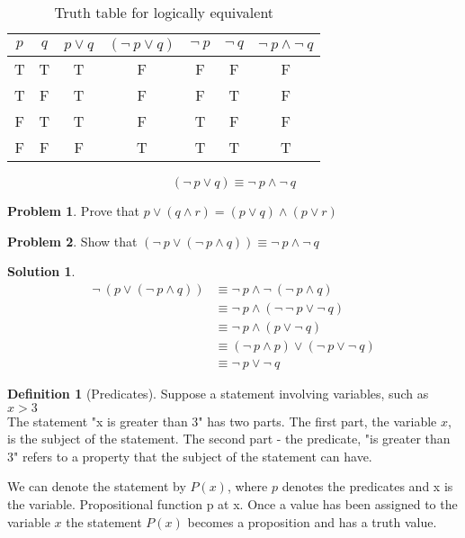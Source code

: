 \documentclass[12pt,oneside,a4paper]{book}
\theoremstyle{remark}
\theoremstyle{definition}
\newtheorem{prob}{Problem}[section]
\newtheorem{defn}{Definition}
\newtheorem*{soln}{Solution}
\begin{document}
\begin{table}[H]
    \centering
    \begin{tabular}{|c|c|c|c|c|c|c|}
        \hline
        $ p $ & $ q $ & \(p\vee q\) & \((\neg\ p\vee q)\) & \(\neg\ p\) & \(\neg\ q\) & \(\neg\ p\wedge \neg\ q\) \\ \hline
        T     & T     & T           & F                   & F           & F           & F                         \\ \hline
        T     & F     & T           & F                   & F           & T           & F                         \\ \hline
        F     & T     & T           & F                   & T           & F           & F                         \\ \hline
        F     & F     & F           & T                   & T           & T           & T                         \\ \hline
    \end{tabular}
    \caption{Truth table for logically equivalent}
    \[(\neg\ p\vee q)\equiv \neg\ p\wedge \neg\ q\]
\end{table}
\begin{prob}
    Prove that \(p\vee(q\wedge r)=(p\vee q)\wedge(p\vee r)\)
\end{prob}
\begin{prob}
    Show that \((\neg\ p\vee(\neg\ p\wedge q))\equiv\neg\ p \wedge \neg\ q\)
\end{prob}
\begin{soln}
    \begin{align*}
        \neg\ (p\vee(\neg\ p\wedge q)) & \equiv \neg\ p \wedge \neg\ (\neg\ p \wedge q)       \\
                                       & \equiv \neg\ p \wedge (\neg\ \neg\ p\vee \neg\ q)    \\
                                       & \equiv \neg\ p \wedge(p\vee \neg\ q)                 \\
                                       & \equiv (\neg\ p\wedge p) \vee (\neg\ p \vee \neg\ q) \\
                                       & \equiv \neg\ p \vee \neg\ q
    \end{align*}
\end{soln}
\begin{defn}[Predicates]
    Suppose a statement involving variables, such as \(x>3\)\\
    The statement "x is greater than 3" has two parts.
    The first part, the variable $ x $, is the subject of the statement.
    The second part - the predicate, "is greater than 3" refers to a property that the subject of the statement can have.

    We can denote the statement by \(P(x)\), where $ p $ denotes the predicates and x is the variable.
    Propositional function p at x. Once a value has been assigned to the variable $ x $ the statement \(P(x)\) becomes a proposition and has a truth value.
\end{defn}
\end{document}
